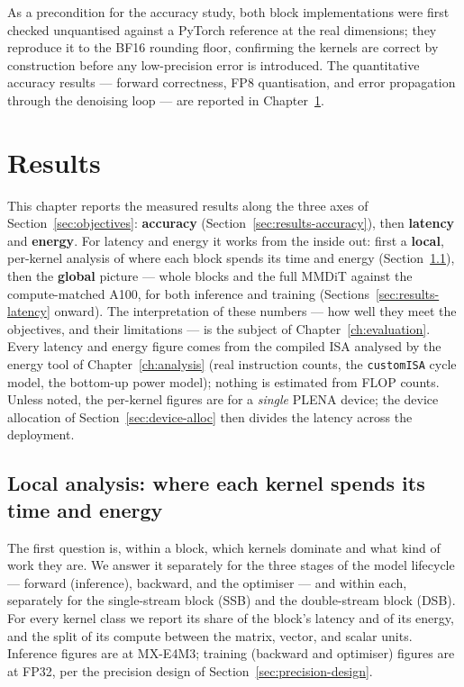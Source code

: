 \documentclass[11pt]{report}
\begin{document}
As a precondition for the accuracy study, both block implementations were
first checked unquantised against a PyTorch reference at the real
dimensions; they reproduce it to the BF16 rounding floor, confirming the
kernels are correct by construction before any low-precision error is
introduced. The quantitative accuracy results --- forward correctness, FP8
quantisation, and error propagation through the denoising loop --- are
reported in Chapter~\ref{ch:results}.


\chapter{Results}
\label{ch:results}

This chapter reports the measured results along the three axes of
Section~\ref{sec:objectives}: \textbf{accuracy}
(Section~\ref{sec:results-accuracy}), then \textbf{latency} and
\textbf{energy}. For latency and energy it works from the inside out: first
a \textbf{local}, per-kernel analysis of where each block spends its time and
energy (Section~\ref{sec:local-analysis}), then the \textbf{global} picture
--- whole blocks and the full MMDiT against the compute-matched A100, for
both inference and training (Sections~\ref{sec:results-latency} onward). The
interpretation of these numbers --- how well they meet the objectives, and
their limitations --- is the subject of Chapter~\ref{ch:evaluation}. Every
latency and energy figure comes from the compiled ISA analysed by the energy
tool of Chapter~\ref{ch:analysis} (real instruction counts, the
\texttt{customISA} cycle model, the bottom-up power model); nothing is
estimated from FLOP counts. Unless noted, the per-kernel figures are for a
\emph{single} PLENA device; the device allocation of
Section~\ref{sec:device-alloc} then divides the latency across the
deployment.

\section{Local analysis: where each kernel spends its time and energy}
\label{sec:local-analysis}

The first question is, within a block, which kernels dominate and what kind
of work they are. We answer it separately for the three stages of the model
lifecycle --- forward (inference), backward, and the optimiser --- and within
each, separately for the single-stream block (SSB) and the double-stream
block (DSB). For every kernel class we report its share of the block's
latency and of its energy, and the split of its compute between the matrix,
vector, and scalar units. Inference figures are at MX-E4M3; training
(backward and optimiser) figures are at FP32, per the precision design of
Section~\ref{sec:precision-design}.
\end{document}
